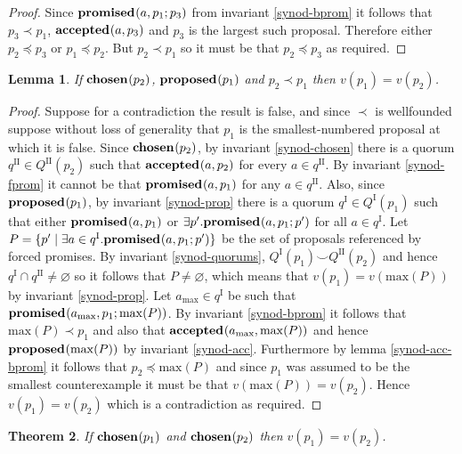 \documentclass[journal]{IEEEtran}
\newtheorem{theorem}{Theorem}
\newtheorem{lemma}[theorem]{Lemma}
\begin{document}
\begin{proof}Since $\mathbf{promised}_{}(a,p_1;p_3)$ from invariant \ref{synod-bprom} it
follows that $p_3 \prec p_1$, $\mathbf{accepted}_{}(a,p_3)$ and $p_3$ is the largest such
proposal. Therefore either $p_2 \preceq p_3$ or $p_1 \preceq p_2$.  But $p_2
\prec p_1$ so it must be that $p_2 \preceq p_3$ as required.  \end{proof}

\begin{lemma}\label{synod-lemma} If $\mathbf{chosen}_{}(p_2)$, $\mathbf{proposed}_{}(p_1)$ and $p_2
\prec p_1$ then $v(p_1) = v(p_2)$. \end{lemma}

\begin{proof}Suppose for a contradiction the result is false, and since $\prec$
is wellfounded suppose without loss of generality that $p_1$ is the
smallest-numbered proposal at which it is false.  Since $\mathbf{chosen}_{}(p_2)$, by
invariant \ref{synod-chosen} there is a quorum $q^\textrm{II} \in
Q^\textrm{II}(p_2)$ such that $\mathbf{accepted}_{}(a,p_2)$ for every $a \in q^\textrm{II}$.
By invariant \ref{synod-fprom} it cannot be that $\mathbf{promised}_{}(a,p_1)$ for any $a
\in q^\textrm{II}$.  Also, since $\mathbf{proposed}_{}(p_1)$, by invariant \ref{synod-prop}
there is a quorum $q^\textrm{I} \in Q^\textrm{I}(p_1)$ such that either
$\mathbf{promised}_{}(a,p_1)$ or $\exists p'.  \mathbf{promised}_{}(a,p_1;p')$ for all $a \in
q^\textrm{I}$.  Let $P = \{ p' \mid \exists a \in q^\textrm{I}.
\mathbf{promised}_{}(a,p_1;p') \}$ be the set of proposals referenced by forced promises.
By invariant \ref{synod-quorums}, ${Q^\textrm{I}(p_1) \smile
Q^\textrm{II}(p_2)}$ and hence $q^\textrm{I} \cap q^\textrm{II} \ne
\varnothing$ so it follows that $P \ne \varnothing$, which means that $v(p_1) =
v(\mathrm{max}(P))$ by invariant \ref{synod-prop}. Let $a_{\mathrm{max}} \in
q^\textrm{I}$ be such that $\mathbf{promised}_{}(a_{\mathrm{max}},p_1;\mathrm{max}(P))$.
By invariant \ref{synod-bprom} it follows that $\mathrm{max}(P) \prec p_1$ and
also that $\mathbf{accepted}_{}(a_{\mathrm{max}},\mathrm{max}(P))$ and hence
$\mathbf{proposed}_{}(\mathrm{max}(P))$ by invariant \ref{synod-acc}. Furthermore by lemma
\ref{synod-acc-bprom} it follows that $p_2 \preceq \mathrm{max}(P)$ and since
$p_1$ was assumed to be the smallest counterexample it must be that
$v(\mathrm{max}(P)) = v(p_2)$.  Hence $v(p_1) = v(p_2)$ which is a
contradiction as required.  \end{proof}

\begin{theorem}\label{synod-safety-theorem} If $\mathbf{chosen}_{}(p_1)$ and
$\mathbf{chosen}_{}(p_2)$ then $v(p_1) = v(p_2)$.  \end{theorem}
\end{document}
